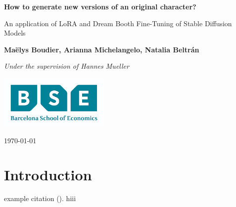 \documentclass[12pt, a4paper]{article}
\begin{document}
\begin{titlepage}
    \begin{center}
        \vspace*{3cm}
            
        \Huge
        \textbf{How to generate new versions of an original character?}
            
        \vspace{1cm}
        \Large
        An application of LoRA and Dream Booth Fine-Tuning of Stable Diffusion Models
            
        \vspace{1.5cm}
        \large
            
        \textbf{Maëlys Boudier, Arianna Michelangelo, Natalia Beltrán}    %
        
            
        \vfill
        
        \textit{Under the supervision of Hannes Mueller}
            
        \vspace{1cm}
            
        \includegraphics[width=0.4\textwidth]{bse_logo.png}
        \\
        
        \Large
        
        \today
            
    \end{center}
\end{titlepage}


\section{Introduction}
example citation (\cite{lora2021}).
hiii


\printbibliography[]
\end{document}
